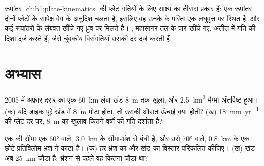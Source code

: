 \begin{omfigure}
\par{}
\label{fig:b1:rifts-ridges-margins:transform}
\end{omfigure}

रूपांतर \cref{ch:b1:plate-kinematics} की प्लेट गतियों के लिए साक्ष्य का तीसरा प्रकार हैं: एक रूपांतर दोनों प्लेटों के सापेक्ष वेग के अनुदिश चलता है, इसलिए वह उनके  के परितः एक लघुवृत्त पर स्थित है, और कई रूपांतरों के लंबवत खींचे गए  ध्रुव पर मिलते हैं। , महासागर-तल के पार खींचे गए, अतीत में गति की दिशा दर्ज करते हैं, जैसे चुंबकीय विसंगतियाँ उसकी दर दर्ज करती हैं।

\section{अभ्यास}

\begin{exercise}[$\star$]\label{exo:b1:rifts-ridges-margins:1}
2005 में अफ़ार दरार का एक \qty{60}{km} लंबा खंड \qty{8}{m} तक खुला, और \qty{2.5}{km^3} मैग्मा अंतर्विष्ट हुआ। (क) यदि डाइक पूरे खंड में \qty{8}{m} मोटा होता, तो उसकी औसत ऊँचाई क्या होती? (ख) \qty{18}{mm.yr^{-1}} की प्लेट दर पर, \qty{8}{m} का खुलाव कितने वर्षों की गति दर्शाता है?
\end{exercise}

\begin{exercise}[$\star$]\label{exo:b1:rifts-ridges-margins:2}
एक  की सीमा एक \ang{60}  वाले, \qty{3.0}{km}  के सीमा-भ्रंश से बंधी है, और उसे \ang{70}  वाले, \qty{0.8}{km}  के एक छोटे प्रतिविलोम भ्रंश ने काटा है। (क) हर भ्रंश का  और खंड का विस्तार परिकलित कीजिए। (ख) खंड अब \qty{25}{km} चौड़ा है: भ्रंशन से पहले वह कितना चौड़ा था?
\end{exercise}

